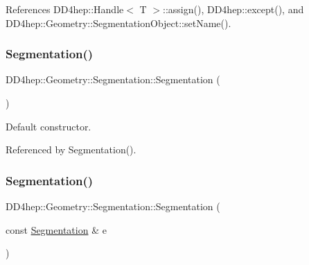 References D\+D4hep\+::\+Handle$<$ T $>$\+::assign(), D\+D4hep\+::except(), and D\+D4hep\+::\+Geometry\+::\+Segmentation\+Object\+::set\+Name().

\hypertarget{class_d_d4hep_1_1_geometry_1_1_segmentation_a191b65b0384259a4b204a2aaedfd2f9c}{}\label{class_d_d4hep_1_1_geometry_1_1_segmentation_a191b65b0384259a4b204a2aaedfd2f9c} 
\subsubsection{\texorpdfstring{Segmentation()}{Segmentation()}\hspace{0.1cm}{\footnotesize\ttfamily [2/5]}}
{\footnotesize\ttfamily D\+D4hep\+::\+Geometry\+::\+Segmentation\+::\+Segmentation (\begin{DoxyParamCaption}{ }\end{DoxyParamCaption})\hspace{0.3cm}{\ttfamily [default]}}



Default constructor. 



Referenced by Segmentation().

\hypertarget{class_d_d4hep_1_1_geometry_1_1_segmentation_a0d8474b604d7eb4ca635007f9e46cbc2}{}\label{class_d_d4hep_1_1_geometry_1_1_segmentation_a0d8474b604d7eb4ca635007f9e46cbc2} 
\subsubsection{\texorpdfstring{Segmentation()}{Segmentation()}\hspace{0.1cm}{\footnotesize\ttfamily [3/5]}}
{\footnotesize\ttfamily D\+D4hep\+::\+Geometry\+::\+Segmentation\+::\+Segmentation (\begin{DoxyParamCaption}\item[{const \hyperlink{class_d_d4hep_1_1_geometry_1_1_segmentation}{Segmentation} \&}]{e }\end{DoxyParamCaption})\hspace{0.3cm}{\ttfamily [inline]}}



